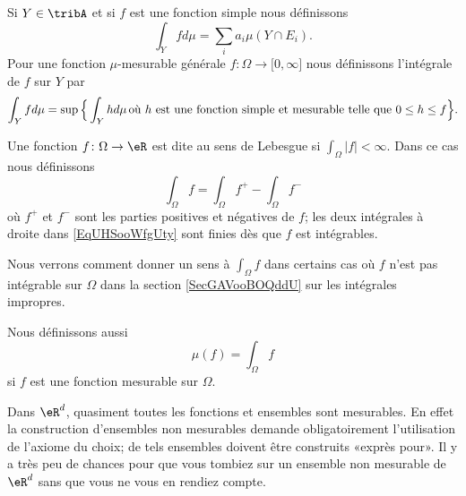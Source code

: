 \begin{definition}  \label{DefTVOooleEst}
    Si \( Y\in \tribA\) et si \( f\) est une fonction simple nous définissons
    \begin{equation}
        \int_Yfd\mu=\sum_ia_i\mu(Y\cap E_i).
    \end{equation}
    Pour une fonction \( \mu\)-mesurable générale \( f\colon \Omega\to \mathopen[ 0 , \infty \mathclose]\) nous définissons l'intégrale de \( f\) sur \( Y\) par
    \begin{equation}        \label{EqDefintYfdmu}
        \int_Yfd\mu=\sup\Big\{ \int_Yhd\mu\,\text{où \( h\) est une fonction simple et mesurable telle que \( 0\leq h\leq f\)} \Big\}.
    \end{equation}
\end{definition}

\begin{definition}  \label{DefTCXooAstMYl}
    Une fonction \( f\colon \Omega\to \eR\) est dite  au sens de Lebesgue si \( \int_{\Omega}| f |<\infty\). Dans ce cas nous définissons
    \begin{equation}    \label{EqUHSooWfgUty}
        \int_{\Omega}f=\int_{\Omega}f^+-\int_{\Omega}f^-
    \end{equation}
    où \( f^+\) et \( f^-\) sont les parties positives et négatives de \( f\); les deux intégrales à droite dans \eqref{EqUHSooWfgUty} sont finies dès que \( f\) est intégrables.
\end{definition}
Nous verrons comment donner un sens à \( \int_{\Omega}f\) dans certains cas où \( f\) n'est pas intégrable sur \( \Omega\) dans la section \ref{SecGAVooBOQddU} sur les intégrales impropres.

Nous définissons aussi
\begin{equation}
    \mu(f)=\int_{\Omega}f
\end{equation}
si \( f\) est une fonction mesurable sur \( \Omega\).

\begin{remark}
    Dans \( \eR^d\), quasiment toutes les fonctions et ensembles sont mesurables. En effet la construction d'ensembles non mesurables demande obligatoirement l'utilisation de l'axiome du choix; de tels ensembles doivent être construits «exprès pour». Il y a très peu de chances pour que vous tombiez sur un ensemble non mesurable de \( \eR^d\) sans que vous ne vous en rendiez compte.
\end{remark}

